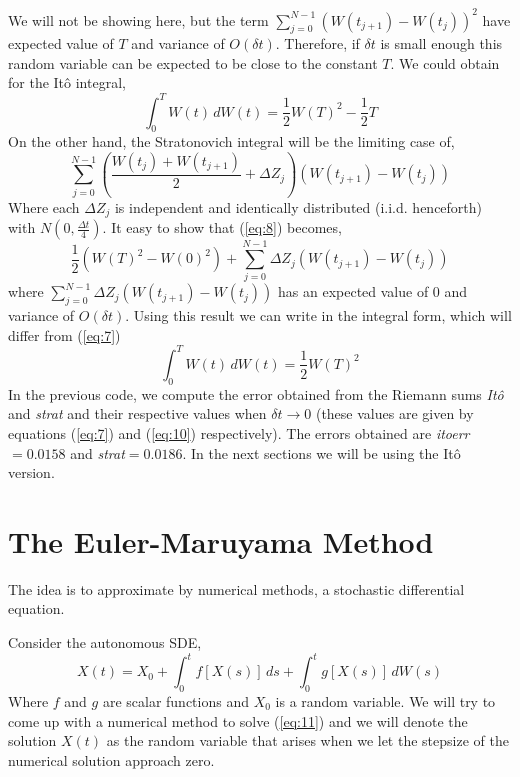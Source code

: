 \documentclass[12pt,a4paper]{article}
\def\d{\delta}
\begin{document}
We will not be showing here, but the term $\sum_{j=0}^{N-1} \left( W(t_{j+1}) - W(t_j)\right)^2$ have expected value of $T$ and variance of $O(\d t)$. Therefore, if $\d t $ is small enough this random variable can be expected to be close to the constant $T$. We could obtain for the It\^{o} integral, 
\begin{equation} \label{eq:7}
\int_0^T W(t)\,dW(t)=\frac{1}{2}W(T)^2-\frac{1}{2}T
\end{equation}
On the other hand, the Stratonovich integral will be the limiting case of, 
\begin{equation} \label{eq:8}
\sum_{j=0}^{N-1} \left(\frac{W(t_j)+W(t_{j+1})}{2} +\Delta Z_j \right) \left(W(t_{j+1}) -W(t_j)\right)
\end{equation}
Where each $\Delta Z_j$ is independent and identically distributed (i.i.d. henceforth) with $N(0,\frac{\Delta t}{4})$. It easy to show that (\ref{eq:8}) becomes, 
\begin{equation} \label{eq:9}
\frac{1}{2} \left(W(T)^2-W(0)^2\right) +\sum_{j=0}^{N-1}\Delta Z_j  \left(W(t_{j+1}) -W(t_j)\right)
\end{equation}
where $\sum_{j=0}^{N-1}\Delta Z_j \left(W(t_{j+1}) -W(t_j)\right)$ has an expected value of $0$ and variance of $O(\d t)$. Using this result we can write in the integral form, which will differ from (\ref{eq:7})
\begin{equation} \label{eq:10}
\int_0^T W(t)\,dW(t)=\frac{1}{2}W(T)^2
\end{equation}
In the previous code, we compute the error obtained from the Riemann sums \textsl{It\^{o}} and \textsl{strat} and their respective values when $\d t \rightarrow 0$ (these values are given by equations (\ref{eq:7}) and (\ref{eq:10}) respectively). The errors obtained are \textsl{itoerr}$=0.0158$ and \textsl{strat}$=0.0186$.
In the next sections we will be using the It\^{o} version. 

\section{The Euler-Maruyama Method}

The idea is to approximate by numerical methods, a stochastic differential equation. 

Consider the autonomous SDE, 
\begin{equation} \label{eq:11}
X(t)=X_0 +\int_0^t f\left[X(s)\right]\,ds+\int_0^t g\left[X(s)\right]\,dW(s)
\end{equation}
Where $f$ and $g$ are scalar functions and $X_0$ is a random variable. We will try to come up with a numerical method to solve (\ref{eq:11}) and we will denote the solution $X(t)$ as the random variable that arises when we let the stepsize of the numerical solution approach zero.  
\end{document}
